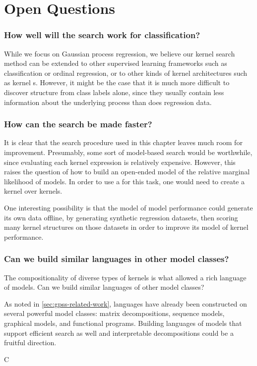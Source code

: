 \section{Open Questions}

\subsubsection{How well will the search work for classification?}
While we focus on Gaussian process regression, we believe our kernel search method can be extended to other supervised learning frameworks such as classification or ordinal regression, or to other kinds of kernel architectures such as kernel \SVM{}s.
However, it might be the case that it is much more difficult to discover structure from class labels alone, since they usually contain less information about the underlying process than does regression data.

\subsubsection{How can the search be made faster?}
It is clear that the search procedure used in this chapter leaves much room for improvement.
Presumably, some sort of model-based search would be worthwhile, since evaluating each kernel expression is relatively expensive.
However, this raises the question of how to build an open-ended model of the relative marginal likelihood of \gp{} models.
In order to use a \gp{} for this task, one would need to create a kernel over kernels.

One interesting possibility is that the model of model performance could generate its own data offline, by generating synthetic regression datasets, then scoring many kernel structures on those datasets in order to improve its model of kernel performance.

\subsubsection{Can we build similar languages in other model classes?}
The compositionality of diverse types of kernels is what allowed a rich language of \gp{} models.
Can we build similar languages of other model classes?

As noted in \cref{sec:gpss-related-work}, languages have already been constructed on several powerful model classes: matrix decompositions, sequence models, graphical models, and functional programs.
Building languages of models that support efficient search as well and interpretable decompositions could be a fruitful direction.
\fi

\outbpdocument{


}




C
